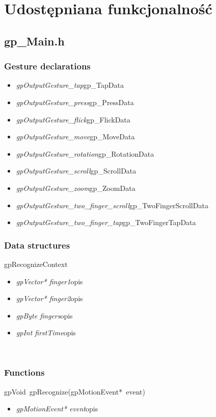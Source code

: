 \section{Udostępniana funkcjonalność}
\subsection{gp_Main.h}
\subsubsection{Gesture declarations}
\begin{itemize}
\item \textit{gpOutputGesture_tap}\quad gp_TapData
\item \textit{gpOutputGesture_press}\quad gp_PressData
\item \textit{gpOutputGesture_flick}\quad gp_FlickData
\item \textit{gpOutputGesture_move}\quad gp_MoveData
\item \textit{gpOutputGesture_rotation}\quad gp_RotationData
\item \textit{gpOutputGesture_scroll}\quad gp_ScrollData
\item \textit{gpOutputGesture_zoom}\quad gp_ZoomData
\item \textit{gpOutputGesture_two_finger_scroll}\quad gp_TwoFingerScrollData
\item \textit{gpOutputGesture_two_finger_tap}\quad gp_TwoFingerTapData
\end{itemize}
\subsubsection{Data structures}
\textsf{gpRecognizeContext}
	\begin{itemize}
		\item \textit{gpVector* finger1}\quad opis
		\item \textit{gpVector* finger2}\quad opis
		\item \textit{gpByte fingers}\quad opis
		\item \textit{gpInt firstTime}\quad opis
	\end{itemize}
\ \\
\subsubsection{Functions}
\mbox{\textsf{gpVoid gpRecognize(gpMotionEvent* event)}}
	\begin{itemize}
		\item \textit{gpMotionEvent* event}\quad opis
	\end{itemize}

